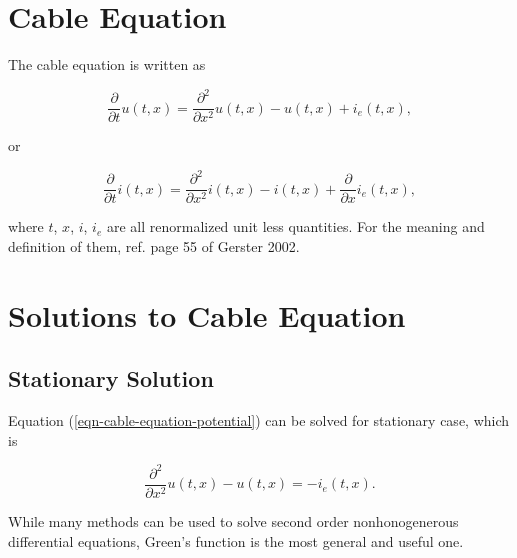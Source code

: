 \section{Cable Equation}


The cable equation is written as \cite{Gerstner2002}

\begin{equation}
    \frac{\partial}{\partial t} u(t,x) = \frac{\partial^2}{\partial x^2} u(t,x) - u(t,x) + i_{e}(t,x), \label{eqn-cable-equation-potential}
\end{equation}

or

\begin{equation}
    \frac{\partial}{\partial t} i(t,x) = \frac{\partial^2}{\partial x^2} i(t,x) - i(t,x) + \frac{\partial}{\partial x} i_e (t,x),\label{eqn-cable-equation-current}
\end{equation}

where $t$, $x$, $i$, $i_e$ are all renormalized unit less quantities. For the meaning and definition of them, ref. page 55 of Gerster 2002\cite{Gerstner2002}.



\section{Solutions to Cable Equation}


\subsection{Stationary Solution}

Equation (\ref{eqn-cable-equation-potential}) can be solved for stationary case, which is

\begin{equation}
     \frac{\partial^2}{\partial x^2} u(t,x) - u(t,x) =- i_{e}(t,x) .\label{eqn-cable-equation-stationary-equation-potential}
\end{equation}

While many methods can be used to solve second order nonhonogenerous differential equations, Green's function is the most general and useful one.




